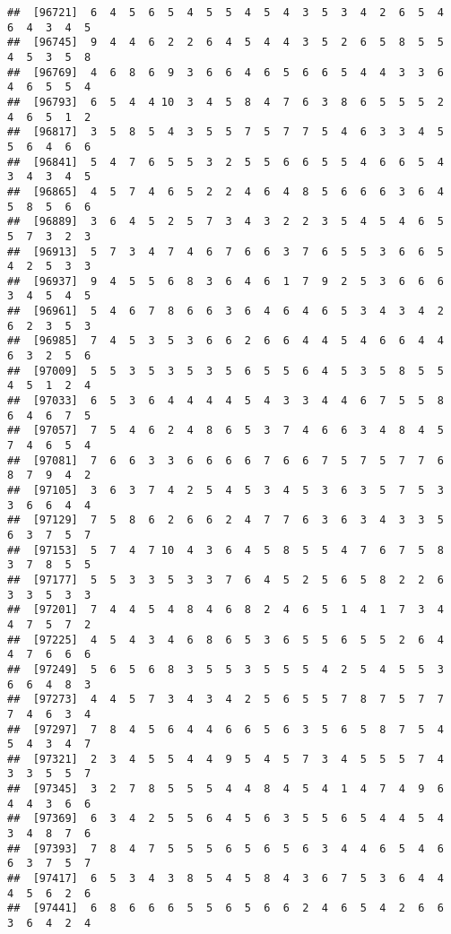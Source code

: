 \documentclass[
]{book}
\begin{document}
\begin{verbatim}
##  [96721]  6  4  5  6  5  4  5  5  4  5  4  3  5  3  4  2  6  5  4  6  4  3  4  5
##  [96745]  9  4  4  6  2  2  6  4  5  4  4  3  5  2  6  5  8  5  5  4  5  3  5  8
##  [96769]  4  6  8  6  9  3  6  6  4  6  5  6  6  5  4  4  3  3  6  4  6  5  5  4
##  [96793]  6  5  4  4 10  3  4  5  8  4  7  6  3  8  6  5  5  5  2  4  6  5  1  2
##  [96817]  3  5  8  5  4  3  5  5  7  5  7  7  5  4  6  3  3  4  5  5  6  4  6  6
##  [96841]  5  4  7  6  5  5  3  2  5  5  6  6  5  5  4  6  6  5  4  3  4  3  4  5
##  [96865]  4  5  7  4  6  5  2  2  4  6  4  8  5  6  6  6  3  6  4  5  8  5  6  6
##  [96889]  3  6  4  5  2  5  7  3  4  3  2  2  3  5  4  5  4  6  5  5  7  3  2  3
##  [96913]  5  7  3  4  7  4  6  7  6  6  3  7  6  5  5  3  6  6  5  4  2  5  3  3
##  [96937]  9  4  5  5  6  8  3  6  4  6  1  7  9  2  5  3  6  6  6  3  4  5  4  5
##  [96961]  5  4  6  7  8  6  6  3  6  4  6  4  6  5  3  4  3  4  2  6  2  3  5  3
##  [96985]  7  4  5  3  5  3  6  6  2  6  6  4  4  5  4  6  6  4  4  6  3  2  5  6
##  [97009]  5  5  3  5  3  5  3  5  6  5  5  6  4  5  3  5  8  5  5  4  5  1  2  4
##  [97033]  6  5  3  6  4  4  4  4  5  4  3  3  4  4  6  7  5  5  8  6  4  6  7  5
##  [97057]  7  5  4  6  2  4  8  6  5  3  7  4  6  6  3  4  8  4  5  7  4  6  5  4
##  [97081]  7  6  6  3  3  6  6  6  6  7  6  6  7  5  7  5  7  7  6  8  7  9  4  2
##  [97105]  3  6  3  7  4  2  5  4  5  3  4  5  3  6  3  5  7  5  3  3  6  6  4  4
##  [97129]  7  5  8  6  2  6  6  2  4  7  7  6  3  6  3  4  3  3  5  6  3  7  5  7
##  [97153]  5  7  4  7 10  4  3  6  4  5  8  5  5  4  7  6  7  5  8  3  7  8  5  5
##  [97177]  5  5  3  3  5  3  3  7  6  4  5  2  5  6  5  8  2  2  6  3  3  5  3  3
##  [97201]  7  4  4  5  4  8  4  6  8  2  4  6  5  1  4  1  7  3  4  4  7  5  7  2
##  [97225]  4  5  4  3  4  6  8  6  5  3  6  5  5  6  5  5  2  6  4  4  7  6  6  6
##  [97249]  5  6  5  6  8  3  5  5  3  5  5  5  4  2  5  4  5  5  3  6  6  4  8  3
##  [97273]  4  4  5  7  3  4  3  4  2  5  6  5  5  7  8  7  5  7  7  7  4  6  3  4
##  [97297]  7  8  4  5  6  4  4  6  6  5  6  3  5  6  5  8  7  5  4  5  4  3  4  7
##  [97321]  2  3  4  5  5  4  4  9  5  4  5  7  3  4  5  5  5  7  4  3  3  5  5  7
##  [97345]  3  2  7  8  5  5  5  4  4  8  4  5  4  1  4  7  4  9  6  4  4  3  6  6
##  [97369]  6  3  4  2  5  5  6  4  5  6  3  5  5  6  5  4  4  5  4  3  4  8  7  6
##  [97393]  7  8  4  7  5  5  5  6  5  6  5  6  3  4  4  6  5  4  6  6  3  7  5  7
##  [97417]  6  5  3  4  3  8  5  4  5  8  4  3  6  7  5  3  6  4  4  4  5  6  2  6
##  [97441]  6  8  6  6  6  5  5  6  5  6  6  2  4  6  5  4  2  6  6  3  6  4  2  4

\end{verbatim}
\end{document}
